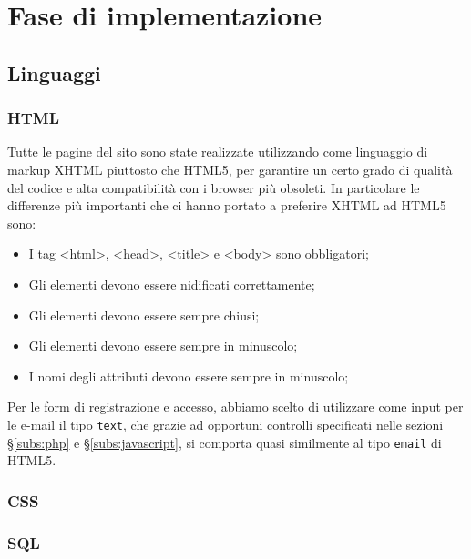 \section{Fase di implementazione}
\label{sec:fase_di_implementazione}
\subsection{Linguaggi}
\subsubsection{HTML}
Tutte le pagine del sito sono state realizzate utilizzando come linguaggio di markup XHTML piuttosto che HTML5, per garantire un certo grado di qualità del codice e alta compatibilità con i browser più obsoleti. In particolare le differenze più importanti che ci hanno portato a preferire XHTML ad HTML5 sono:
\begin{itemize}
	\item I tag <html>, <head>, <title> e <body> sono obbligatori;
	\item Gli elementi devono essere nidificati correttamente;
	\item Gli elementi devono essere sempre chiusi;
	\item Gli elementi devono essere sempre in minuscolo;
	\item I nomi degli attributi devono essere sempre in minuscolo;
\end{itemize}
Per le form di registrazione e accesso, abbiamo scelto di utilizzare come input per le e-mail il tipo \texttt{text}, che grazie ad opportuni controlli specificati nelle sezioni \S\ref{subs:php} e \S\ref{subs:javascript}, si comporta quasi similmente al tipo \texttt{email} di HTML5. %

\subsubsection{CSS}

\subsubsection{SQL}

